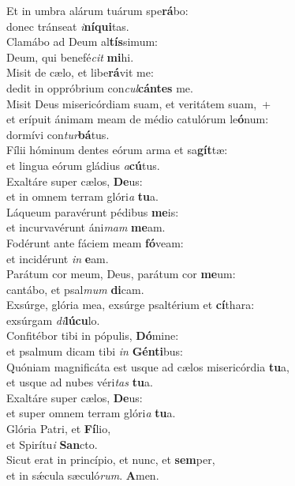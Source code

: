 \evenverse Et in umbra alárum tuárum spe\textbf{rá}bo:~\*\\
\evenverse donec tránseat \textit{i}\textbf{ní}\textbf{qui}tas.\\
\oddverse Clamábo ad Deum al\textbf{tís}simum:~\*\\
\oddverse Deum, qui benefé\textit{cit} \textbf{mi}hi.\\
\evenverse Misit de cælo, et libe\textbf{rá}vit me:~\*\\
\evenverse dedit in oppróbrium con\textit{cul}\textbf{cán}\textbf{tes} me.\\
\oddverse Misit Deus misericórdiam suam, et veritátem suam,~+\\
\oddverse  et erípuit ánimam meam de médio catulórum le\textbf{ó}num:~\*\\
\oddverse dormívi con\textit{tur}\textbf{bá}tus.\\
\evenverse Fílii hóminum dentes eórum arma et sa\textbf{gít}tæ:~\*\\
\evenverse et lingua eórum gládius \textit{a}\textbf{cú}tus.\\
\oddverse Exaltáre super cælos, \textbf{De}us:~\*\\
\oddverse et in omnem terram glóri\textit{a} \textbf{tu}a.\\
\evenverse Láqueum paravérunt pédibus \textbf{me}is:~\*\\
\evenverse et incurvavérunt áni\textit{mam} \textbf{me}am.\\
\oddverse Fodérunt ante fáciem meam \textbf{fó}veam:~\*\\
\oddverse et incidérunt \textit{in} \textbf{e}am.\\
\evenverse Parátum cor meum, Deus, parátum cor \textbf{me}um:~\*\\
\evenverse cantábo, et psal\textit{mum} \textbf{di}cam.\\
\oddverse Exsúrge, glória mea, exsúrge psaltérium et \textbf{cí}thara:~\*\\
\oddverse exsúrgam \textit{di}\textbf{lú}\textbf{cu}lo.\\
\evenverse Confitébor tibi in pópulis, \textbf{Dó}mine:~\*\\
\evenverse et psalmum dicam tibi \textit{in} \textbf{Gén}\textbf{ti}bus:\\
\oddverse Quóniam magnificáta est usque ad cælos misericórdia \textbf{tu}a,~\*\\
\oddverse et usque ad nubes véri\textit{tas} \textbf{tu}a.\\
\evenverse Exaltáre super cælos, \textbf{De}us:~\*\\
\evenverse et super omnem terram glóri\textit{a} \textbf{tu}a.\\
\oddverse Glória Patri, et \textbf{Fí}lio,~\*\\
\oddverse et Spirítu\textit{i} \textbf{San}cto.\\
\evenverse Sicut erat in princípio, et nunc, et \textbf{sem}per,~\*\\
\evenverse et in sǽcula sæculó\textit{rum}. \textbf{A}men.\\
